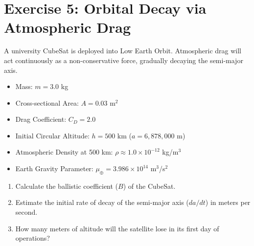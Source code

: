 \documentclass[12pt, letterpaper]{article}
\begin{document}
\section*{Exercise 5: Orbital Decay via Atmospheric Drag}
A university CubeSat is deployed into Low Earth Orbit. Atmospheric drag will act continuously as a non-conservative force, gradually decaying the semi-major axis.
\begin{itemize}
    \item Mass: $m = 3.0$ kg
    \item Cross-sectional Area: $A = 0.03$ m$^2$
    \item Drag Coefficient: $C_D = 2.0$
    \item Initial Circular Altitude: $h = 500$ km ($a = 6,878,000$ m)
    \item Atmospheric Density at 500 km: $\rho \approx 1.0 \times 10^{-12}$ kg/m$^3$
    \item Earth Gravity Parameter: $\mu_{\oplus} = 3.986 \times 10^{14}$ m$^3$/s$^2$
\end{itemize}
\begin{enumerate}
    \item[a)] Calculate the ballistic coefficient ($B$) of the CubeSat.
    \item[b)] Estimate the initial rate of decay of the semi-major axis ($da/dt$) in meters per second. 
    \item[c)] How many meters of altitude will the satellite lose in its first day of operations?
\end{enumerate}
\end{document}

